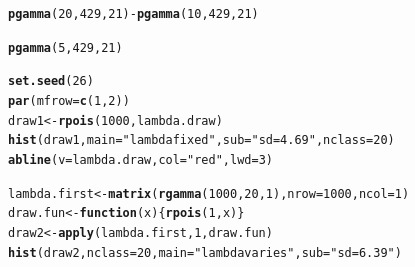 \documentclass[12pt]{article}\usepackage[]{graphicx}\usepackage[]{color}
\makeatletter
\newcommand{\hlnum}[1]{\textcolor[rgb]{0.686,0.059,0.569}{#1}}%
\newcommand{\hlstr}[1]{\textcolor[rgb]{0.192,0.494,0.8}{#1}}%
\newcommand{\hlopt}[1]{\textcolor[rgb]{0,0,0}{#1}}%
\newcommand{\hlstd}[1]{\textcolor[rgb]{0.345,0.345,0.345}{#1}}%
\newcommand{\hlkwa}[1]{\textcolor[rgb]{0.161,0.373,0.58}{\textbf{#1}}}%
\newcommand{\hlkwb}[1]{\textcolor[rgb]{0.69,0.353,0.396}{#1}}%
\newcommand{\hlkwc}[1]{\textcolor[rgb]{0.333,0.667,0.333}{#1}}%
\newcommand{\hlkwd}[1]{\textcolor[rgb]{0.737,0.353,0.396}{\textbf{#1}}}%
\newenvironment{kframe}{%
 \def\at@end@of@kframe{}%
 \ifinner\ifhmode%
  \def\at@end@of@kframe{\end{minipage}}%
  \begin{minipage}{\columnwidth}%
 \fi\fi%
 \def\FrameCommand##1{\hskip\@totalleftmargin \hskip-\fboxsep
 \colorbox{shadecolor}{##1}\hskip-\fboxsep
     \hskip-\linewidth \hskip-\@totalleftmargin \hskip\columnwidth}%
 \MakeFramed {\advance\hsize-\width
   \@totalleftmargin\z@ \linewidth\hsize
   \@setminipage}}%
 {\par\unskip\endMakeFramed%
 \at@end@of@kframe}
\newenvironment{knitrout}{}{} %
\makeatother
\begin{document}
\begin{knitrout}\footnotesize
{}\color{fgcolor}\begin{kframe}
\begin{alltt}
\hlkwd{pgamma}\hlstd{(}\hlnum{20}\hlstd{,} \hlnum{429}\hlstd{,} \hlnum{21}\hlstd{)}\hlopt{-}\hlkwd{pgamma}\hlstd{(}\hlnum{10}\hlstd{,} \hlnum{429}\hlstd{,} \hlnum{21}\hlstd{)}
\end{alltt}
\end{kframe}
\end{knitrout}

\begin{knitrout}\footnotesize
{}\color{fgcolor}\begin{kframe}
\begin{alltt}
\hlkwd{pgamma}\hlstd{(}\hlnum{5}\hlstd{,} \hlnum{429}\hlstd{,} \hlnum{21}\hlstd{)}
\end{alltt}
\end{kframe}
\end{knitrout}

\begin{knitrout}\footnotesize
{}\color{fgcolor}\begin{kframe}
\begin{alltt}
\hlkwd{set.seed}\hlstd{(}\hlnum{26}\hlstd{)}
\hlkwd{par}\hlstd{(}\hlkwc{mfrow}\hlstd{=}\hlkwd{c}\hlstd{(}\hlnum{1}\hlstd{,}\hlnum{2}\hlstd{))}
\hlstd{draw1} \hlkwb{<-} \hlkwd{rpois}\hlstd{(}\hlnum{1000}\hlstd{, lambda.draw)}
\hlkwd{hist}\hlstd{(draw1,} \hlkwc{main}\hlstd{=}\hlstr{"lambda fixed"}\hlstd{,} \hlkwc{sub}\hlstd{=}\hlstr{"sd=4.69"}\hlstd{,} \hlkwc{nclass}\hlstd{=}\hlnum{20}\hlstd{)}
\hlkwd{abline}\hlstd{(}\hlkwc{v}\hlstd{=lambda.draw,} \hlkwc{col}\hlstd{=}\hlstr{"red"}\hlstd{,} \hlkwc{lwd}\hlstd{=}\hlnum{3}\hlstd{)}

\hlstd{lambda.first} \hlkwb{<-} \hlkwd{matrix}\hlstd{(}\hlkwd{rgamma}\hlstd{(}\hlnum{1000}\hlstd{,} \hlnum{20}\hlstd{,} \hlnum{1}\hlstd{),} \hlkwc{nrow}\hlstd{=}\hlnum{1000}\hlstd{,} \hlkwc{ncol}\hlstd{=}\hlnum{1}\hlstd{)}
\hlstd{draw.fun} \hlkwb{<-} \hlkwa{function}\hlstd{(}\hlkwc{x}\hlstd{)\{}\hlkwd{rpois}\hlstd{(}\hlnum{1}\hlstd{, x)\}}
\hlstd{draw2} \hlkwb{<-} \hlkwd{apply}\hlstd{(lambda.first,} \hlnum{1}\hlstd{, draw.fun)}
\hlkwd{hist}\hlstd{(draw2,} \hlkwc{nclass}\hlstd{=}\hlnum{20}\hlstd{,} \hlkwc{main}\hlstd{=}\hlstr{"lambda varies"}\hlstd{,} \hlkwc{sub}\hlstd{=}\hlstr{"sd=6.39"}\hlstd{)}
\end{alltt}
\end{kframe}
\end{knitrout}
\end{document}
